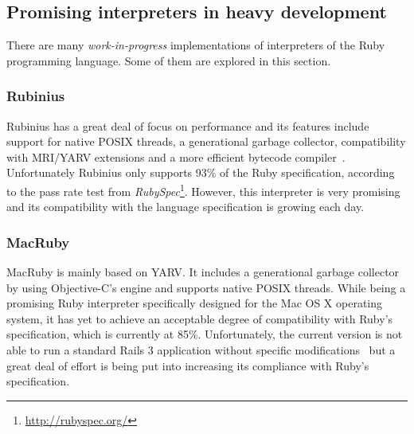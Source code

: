 \subsection{Promising interpreters in heavy development}

There are many \textit{work-in-progress} implementations of interpreters of the Ruby programming language. Some of them are explored in this section.

\subsubsection{Rubinius}

Rubinius has a great deal of focus on performance and its features include support for native POSIX threads, a generational garbage collector, compatibility with MRI/YARV extensions and a more efficient bytecode compiler~\cite{rubinius, rubinius_virtual_machine, rubinius_virtual_machine_rewrite}. Unfortunately Rubinius only supports 93\% of the Ruby specification, according to the pass rate test from \textit{RubySpec}\footnote{\url{http://rubyspec.org/}}. However, this interpreter is very promising and its compatibility with the language specification is growing each day.


\subsubsection{MacRuby}

MacRuby is mainly based on YARV. It includes a generational garbage collector by using Objective-C's engine and supports native POSIX threads. While being a promising Ruby interpreter specifically designed for the Mac OS X operating system, it has yet to achieve an acceptable degree of compatibility with Ruby's specification, which is currently at 85\%. Unfortunately, the current version is not able to run a standard Rails 3 application without specific modifications~\cite{macruby_06} but a great deal of effort is being put into increasing its compliance with Ruby's specification.
